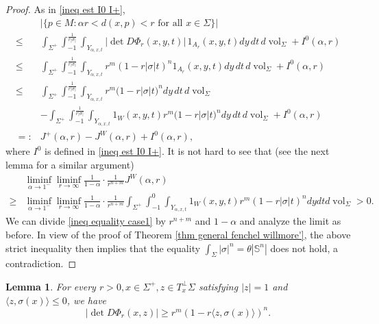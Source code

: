 \documentclass[11pt, reqno]{amsart}
\newtheorem{lemma}[theorem]{Lemma}
\numberwithin{equation}{section}
\begin{document}
\begin{proof}
As in \eqref{ineq est I0 I+},
\begin{equation}\label{ineq equality case1}
\begin{aligned}
& |\{p \in M: \alpha r < d(x, p) < r \text{ for all } x \in \Sigma\}|\\
\le& \int_{\Sigma^+} \int_{-1}^{\frac{1}{r|\sigma|}} \int_{Y_{\alpha, x, t}} \left|\det D\Phi_{r}(x, y, t)\right|\, 1_{A_r}(x, y, t) dy\, dt\, d\operatorname{vol}_{\Sigma}+I^0(\alpha, r) \\
\le& \int_{\Sigma^+} \int_{-1}^{ \frac{1}{r|\sigma|}} \int_{Y_{\alpha, x, t}} r^m(1-r|\sigma| t)^n 1_{A_r}(x, y, t) dy\, dt\, d\operatorname{vol}_{\Sigma}+I^0(\alpha, r) \\
\le& \int_{\Sigma^+} \int_{-1}^{ \frac{1}{r|\sigma|}} \int_{Y_{\alpha, x, t}} r^{m}\bigl(1-r|\sigma| t\bigr)^{n} dy\, dt\, d\operatorname{vol}_{\Sigma}\\
& - \int_{\Sigma^+} \int_{-1}^{ \frac{1}{r|\sigma|}} \int_{Y_{\alpha, x, t}}1_{W}(x, y, t) r^{m}\bigl(1-r|\sigma| t\bigr)^{n} dy\, dt\, d\operatorname{vol}_{\Sigma}+I^0(\alpha, r)\\
=:& J^+(\alpha, r) -J^W(\alpha, r)+I^0(\alpha, r),
\end{aligned}
\end{equation}
where $I^0$ is defined in \eqref{ineq est I0 I+}. It is not hard to see that (see the next lemma for a similar argument)
\begin{align*}
& \liminf_{\alpha \rightarrow 1^{-}} \liminf_{r \rightarrow \infty} \frac{1}{1-\alpha} \cdot \frac{1}{r^{n+m}}J^W(\alpha, r)\\
\ge& \liminf_{\alpha \rightarrow 1^{-}} \liminf_{r \rightarrow \infty} \frac{1}{1-\alpha} \cdot \frac{1}{r^{n+m}}\int_{\Sigma^+} \int_{-1}^{0} \int_{Y_{\alpha, x, t}} 1_W(x, y, t) r^m(1-r|\sigma| t)^n d y d t d \operatorname{vol}_{\Sigma}>0.
\end{align*}
We can divide \eqref{ineq equality case1} by $r^{n+m}$ and $1-\alpha$ and analyze the limit as before. In view of the proof of Theorem \ref{thm general fenchel willmore'}, the above strict inequality then implies that the equality $\int_\Sigma|\sigma|^n= \theta|\mathbb S^n|$ does not hold, a contradiction.
\end{proof}

\begin{lemma}\label{lem xyt=1}
For every $r>0, x \in \Sigma^+, z \in {T}_x^{\perp} \Sigma$ satisfying $|z|=1$ and $\langle z, \sigma(x)\rangle \le0$, we have
$$
\left|\det D \Phi_r(x, z)\right| \ge r^m\left(1-r\langle z, \sigma(x) \rangle \right)^n.
$$
\end{lemma}
\end{document}

